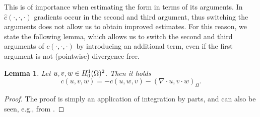 \documentclass{m2an}
\newcommand\blue[1]{\textcolor{black}{#1}}
\newtheorem{lemma}[theorem]{Lemma}
\newcommand{\Oprod}[1]{\left( #1 \right)_{\Omega}}
\newcommand{\chatO}[1]{\hat c\left( #1 \right)}
\newcommand{\cO}[1]{c\left( #1 \right)}
\begin{document}
This is of importance when estimating the form in terms of its arguments.
In $\chatO{\cdot,\cdot,\cdot}$ gradients occur in the second and third argument, thus switching the
arguments does not allow us to obtain improved estimates.
For this reason, we state the following lemma, which allows us to switch the second and third
arguments of $\cO{\cdot,\cdot,\cdot}$ by introducing an additional term,
even if the first argument is not (pointwise) divergence free.
\begin{lemma}\label{lemm:c_swap_no_div}
  Let $u,v,w \in \blue{H^1_0(\Omega)^2}$. Then it holds
  \begin{equation*}
    \cO{u,v,w} 
    = - \cO{u,w,v} - \Oprod{\nabla \cdot u, v \cdot w}.
  \end{equation*}
\end{lemma}
\begin{proof}
  The proof is simply an application of integration by parts, and can also be seen, e.g., from
  \cite[Equation 2.9]{ahmed_higherorder_2021}.
\end{proof}
\end{document}
